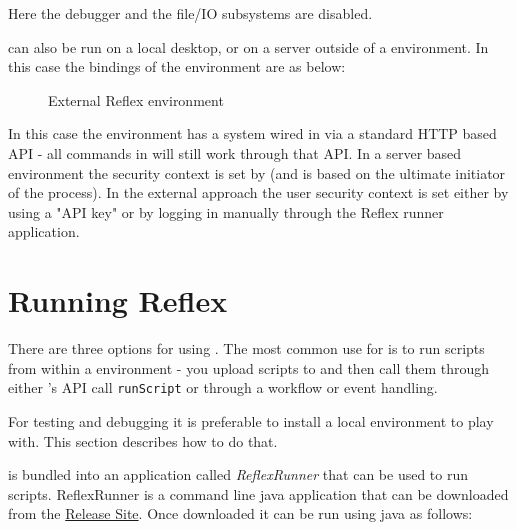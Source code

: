 Here the debugger and the file/IO subsystems are disabled.

\Reflex can also be run on a local desktop, or on a server outside of a \Rapture environment. In this case the bindings of the environment are as below:
\begin{figure}[H]
\centering
{}
\caption { External Reflex environment }
\end{figure}

In this case the environment has a \Rapture system wired in via a standard HTTP based API - all \Rapture commands in \Reflex will still work through that API. In a server based environment the security context is set by \Rapture (and is based on the ultimate initiator of the \Reflex process). In the external approach the user security context is set either by using a \Rapture "API key" or by logging in manually through the Reflex runner application.

\chapter{Running Reflex}
There are three options for using \Reflex. The most common use for \Reflex is to run scripts from within a \Rapture environment - you upload scripts to \Rapture and then call them through either \Rapture's API call \Verb+runScript+ or through a \Rapture workflow or event handling.

For testing and debugging it is preferable to install a local environment to play with. This section describes how to do that.

\Reflex is bundled into an application called \emph{ReflexRunner} that can be used to run \Reflex scripts. ReflexRunner is a command line java application that can be downloaded from the \href{http://incapture.github.com/RaptureRepo/release}{\Rapture Release Site}. Once downloaded it can be run using java as follows:

